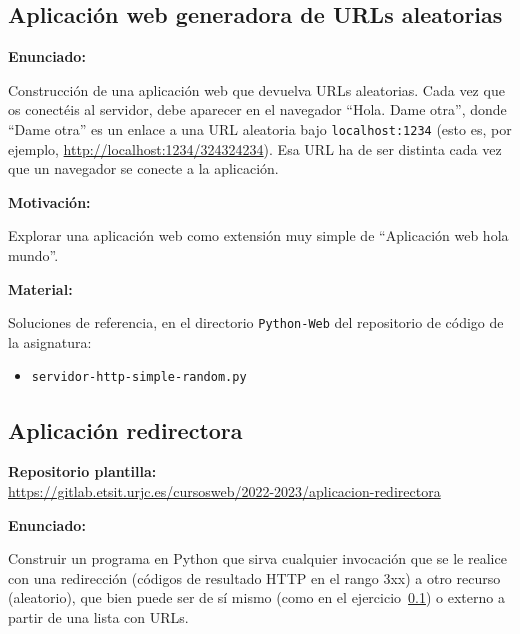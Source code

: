 \subsection{Aplicación web generadora de URLs aleatorias}
\label{subsec:aplweb-urls-aleatorias}

\textbf{Enunciado:}

Construcción de una aplicación web que devuelva URLs aleatorias. Cada vez que os conectéis al servidor, debe aparecer en el navegador ``Hola. Dame otra'', donde ``Dame otra'' es un enlace a una URL aleatoria bajo \verb|localhost:1234| (esto es, por ejemplo, \url{http://localhost:1234/324324234}). Esa URL ha de ser distinta cada vez que un navegador se conecte a la aplicación.


\textbf{Motivación:}

Explorar una aplicación web como extensión muy simple de ``Aplicación web hola mundo''.

\textbf{Material:}

Soluciones de referencia, en el directorio \verb|Python-Web| del repositorio de código de la asignatura:


\begin{itemize}
\item \verb|servidor-http-simple-random.py|
\end{itemize}

\subsection{Aplicación redirectora}
\label{subsec:aplweb-redirectora}

\textbf{Repositorio plantilla:} \\
\url{https://gitlab.etsit.urjc.es/cursosweb/2022-2023/aplicacion-redirectora}

\textbf{Enunciado:}

Construir un programa en Python que sirva cualquier invocación que se le realice con una redirección (códigos de resultado HTTP en el rango 3xx) a otro recurso (aleatorio), que bien puede ser de sí mismo (como en el ejercicio~\ref{subsec:aplweb-urls-aleatorias}) o externo a partir de una lista con URLs.

